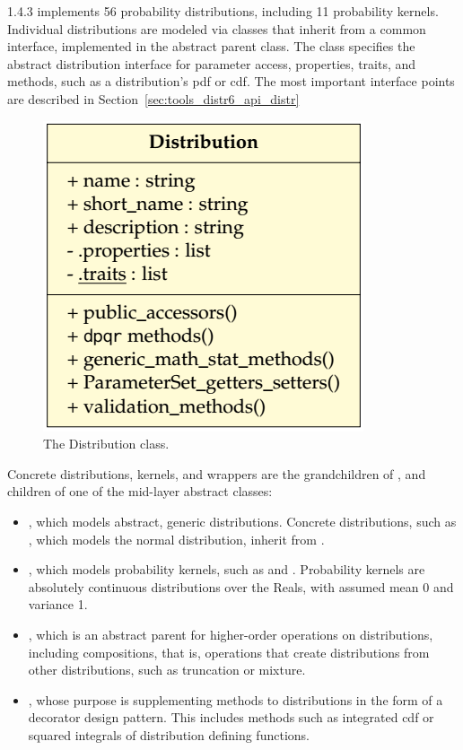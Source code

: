  1.4.3 implements 56 probability distributions, including 11 probability kernels. Individual distributions are modeled via classes that inherit from a common interface, implemented in the abstract  parent class. The  class specifies the abstract distribution interface for parameter access, properties, traits, and methods, such as a distribution's pdf or cdf. The most important interface points are described in Section~\ref{sec:tools_distr6_api_distr}

\begin{figure}[h]
\centering
\includegraphics[scale=0.4]{images/uml_1}
\caption{The Distribution class.}
\end{figure}

Concrete distributions, kernels, and wrappers are the grandchildren of , and children of one of the mid-layer abstract classes:
\begin{itemize}
\itemsep-0.2em
\item {}, which models abstract, generic distributions. Concrete distributions, such as , which models the normal distribution, inherit from .
\item {}, which models probability kernels, such as  and . Probability kernels are absolutely continuous distributions over the Reals, with assumed mean 0 and variance 1.
\item {}, which is an abstract parent for higher-order operations on distributions, including compositions, that is, operations that create distributions from other distributions, such as truncation or mixture.
\item {}, whose purpose is supplementing methods to distributions in the form of a decorator design pattern. This includes methods such as integrated cdf or squared integrals of distribution defining functions.
\end{itemize}

